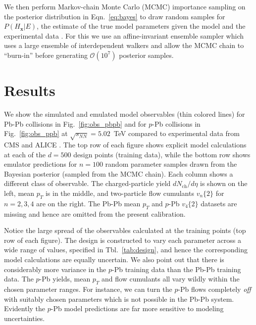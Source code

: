\documentclass[aps,prc,reprint,amsmath,nofootinbib]{revtex4-1}
\newcommand{\sqrts}{\sqrt{s_{NN}}}
\newcommand{\nch}{N_\text{ch}}
\newcommand{\vnk}[2]{v_#1\{#2\}}
\newcommand{\x}{\mathbf x}
\newcommand{\order}[1]{$\mathcal O(10^{#1})$}
\begin{document}
We then perform Markov-chain Monte Carlo (MCMC) importance sampling on the posterior distribution in Eqn.~\eqref{eq:bayes} to draw random samples for $P(H_\x | E)$, the estimate of the true model parameters given the model and the experimental data \cite{Goodman:2010en, FM:2013mc}.
For this we use an affine-invariant ensemble sampler which uses a large ensemble of interdependent walkers \cite{Goodman:2010en, FM:2013mc} and allow the MCMC chain to ``burn-in'' before generating \order{7} posterior samples.


\section{Results}
\label{sec:results}

We show the simulated and emulated model observables (thin colored lines) for Pb-Pb collisions in Fig.~\ref{fig:obs_pbpb} and for \mbox{$p$-Pb} collisions in Fig.~\ref{fig:obs_ppb} at $\sqrts=5.02$~TeV compared to experimental data from CMS \cite{Chatrchyan:2013nka} and ALICE \cite{Adam:2015ptt, Adam:2016izf, Adam:2014qja, Abelev:2013bla}.
The top row of each figure shows explicit model calculations at each of the $d=500$ design points (training data), while the bottom row shows emulator predictions for $n=100$ random parameter samples drawn from the Bayesian posterior (sampled from the MCMC chain).
Each column shows a different class of observable.
The charged-particle yield $d\nch/d\eta$ is shown on the left, mean $p_T$ is in the middle, and two-particle flow cumulants $\vnk{n}{2}$ for $n=2,3,4$ are on the right.
The Pb-Pb mean $p_T$ and $p$-Pb $\vnk{4}{2}$ datasets are missing and hence are omitted from the present calibration.

Notice the large spread of the observables calculated at the training points (top row of each figure).
The design is constructed to vary each parameter across a wide range of values, specified in Tbl.~\ref{tab:design}, and hence the corresponding model calculations are equally uncertain.
We also point out that there is considerably more variance in the $p$-Pb training data than the Pb-Pb training data.
The $p$-Pb yields, mean $p_T$ and flow cumulants all vary wildly within the chosen parameter ranges.
For instance, we can turn the $p$-Pb flows completely \emph{off} with suitably chosen parameters which is not possible in the Pb-Pb system.
Evidently the $p$-Pb model predictions are far more sensitive to modeling uncertainties.
\end{document}
